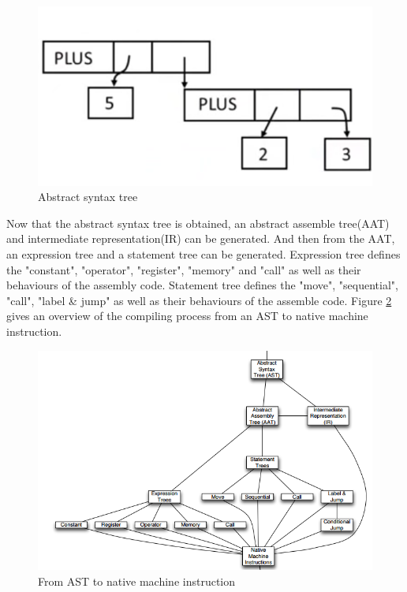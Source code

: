              \begin{figure}[H]
                \centering
                \includegraphics[scale = 0.25]
                {Images/concepts/AST.png}
                \caption[ AST]%
                { Abstract syntax tree\footnotemark}
                \label{fig:AST}
            \end{figure}
             
             
            Now that the abstract syntax tree is obtained, an abstract assemble tree(AAT) and intermediate representation(IR) can be generated. And then from the AAT, an expression tree and a statement tree can be generated. Expression tree defines the "constant", "operator", "register", "memory" and "call" as well as their behaviours of the assembly code. Statement tree defines the "move", "sequential", "call", "label \& jump" as well as their behaviours of the assemble code. Figure \ref{fig:NativeInstruction} gives an overview of the compiling process from an AST to native machine instruction. 
            
             \begin{figure}
                \centering
                \includegraphics[scale = 0.4]
                {Images/concepts/NativeInstruction.png}
                \caption[From AST to assembly]%
                {From AST to native machine instruction\footnotemark}    \label{fig:NativeInstruction}
            \end{figure}
             

